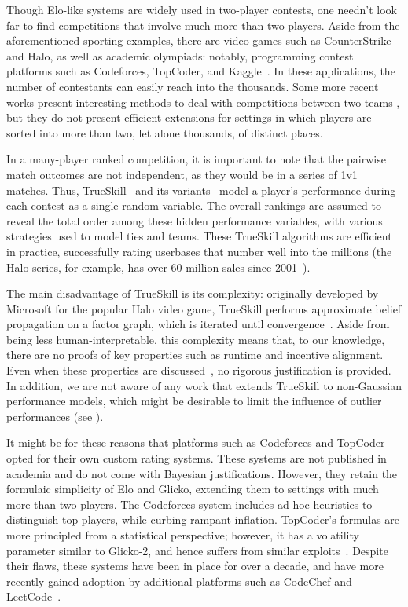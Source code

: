 Though Elo-like systems are widely used in two-player contests, one needn't look far to find competitions that involve much more than two players. Aside from the aforementioned sporting examples, there are video games such as CounterStrike and Halo, as well as academic olympiads: notably, programming contest platforms such as Codeforces, TopCoder, and Kaggle~\cite{Codeforces, TopCoder, Kaggle}. In these applications, the number of contestants can easily reach into the thousands. Some more recent works present interesting methods to deal with competitions between two teams \cite{HLW06, CJ16, LCFHH18, GFYLWTFC20}, but they do not present efficient extensions for settings in which players are sorted into more than two, let alone thousands, of distinct places.%

In a many-player ranked competition, it is important to note that the pairwise match outcomes are not independent, as they would be in a series of 1v1 matches. Thus, TrueSkill~\cite{HMG06} and its variants~\cite{NS10, DHMG07, MCZ18} model a player's performance during each contest as a single random variable. The overall rankings are assumed to reveal the total order among these hidden performance variables, with various strategies used to model ties and teams. These TrueSkill algorithms are efficient in practice, successfully rating userbases that number well into the millions (the Halo series, for example, has over 60 million sales since 2001~\cite{Halo}).

The main disadvantage of TrueSkill is its complexity: originally developed by Microsoft for the popular Halo video game, TrueSkill performs approximate belief propagation on a factor graph, which is iterated until convergence~\cite{HMG06}. Aside from being less human-interpretable, this complexity means that, to our knowledge, there are no proofs of key properties such as runtime and incentive alignment. Even when these properties are discussed~\cite{MCZ18}, no rigorous justification is provided. In addition, we are not aware of any work that extends TrueSkill to non-Gaussian performance models, which might be desirable to limit the influence of outlier performances (see ).

It might be for these reasons that platforms such as Codeforces and TopCoder opted for their own custom rating systems. These systems are not published in academia and do not come with Bayesian justifications. However, they retain the formulaic simplicity of Elo and Glicko, extending them to settings with much more than two players. The Codeforces system includes ad hoc heuristics to distinguish top players, while curbing rampant inflation. TopCoder's formulas are more principled from a statistical perspective; however, it has a volatility parameter similar to Glicko-2, and hence suffers from similar exploits~\cite{forivsektheoretical}. Despite their flaws, these systems have been in place for over a decade, and have more recently gained adoption by additional platforms such as CodeChef and LeetCode~\cite{LeetCode, CodeChef}.

